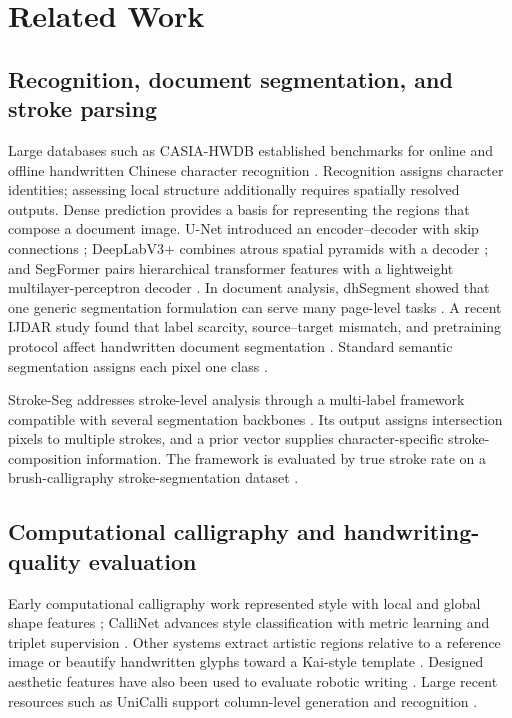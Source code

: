 \section{Related Work}
\label{sec:related}

\subsection{Recognition, document segmentation, and stroke parsing}

Large databases such as CASIA-HWDB established benchmarks for online and
offline handwritten Chinese character recognition \cite{liu2013casia}.
Recognition assigns character identities; assessing local structure
additionally requires spatially resolved outputs. Dense prediction provides
a basis for representing the regions that compose a document image.
U-Net introduced an encoder--decoder with skip connections
\cite{ronneberger2015unet};
DeepLabV3+ combines atrous spatial pyramids with a decoder
\cite{chen2018deeplabv3plus}; and SegFormer pairs hierarchical transformer
features with a lightweight multilayer-perceptron decoder
\cite{xie2021segformer}. In document analysis, dhSegment showed that one generic
segmentation formulation can serve many page-level tasks
\cite{oliveira2018dhsegment}. A recent IJDAR study found that label
scarcity, source--target mismatch, and pretraining protocol affect handwritten
document segmentation \cite{baloun2025selfsupervision}. Standard semantic segmentation assigns
each pixel one class \cite{chen2018deeplabv3plus,xie2021segformer}.

Stroke-Seg addresses stroke-level analysis through a multi-label framework
compatible with several segmentation backbones \cite{gong2024strokeseg}.
Its output assigns intersection pixels to multiple strokes, and a prior
vector supplies character-specific stroke-composition information. The
framework is evaluated by true stroke rate on a brush-calligraphy
stroke-segmentation dataset \cite{gong2024strokeseg}.

\subsection{Computational calligraphy and handwriting-quality evaluation}

Early computational calligraphy work represented style with local and
global shape features
\cite{zhang2015calligraphic,gao2017calligraphic}; CalliNet advances style
classification with metric learning and triplet supervision
\cite{zhang2026callinet}. Other systems extract artistic regions relative
to a reference image \cite{wang2018artistic} or beautify handwritten glyphs
toward a Kai-style template \cite{xia2009beautification}. Designed aesthetic
features have also been used to evaluate robotic writing
\cite{ma2017aesthetics}. Large recent resources such as
UniCalli support column-level generation and recognition
\cite{xu2026unicalli}.

